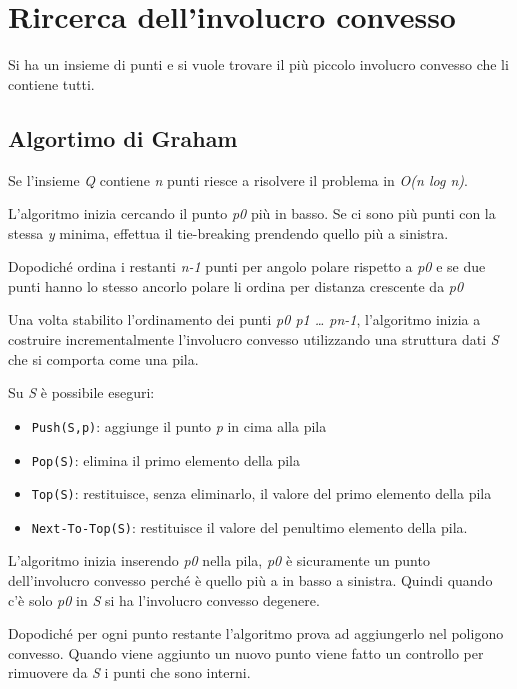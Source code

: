 \section{Rircerca dell'involucro
convesso}\label{rircerca-dellinvolucro-convesso}

Si ha un insieme di punti e si vuole trovare il più piccolo involucro
convesso che li contiene tutti.

\subsection{Algortimo di Graham}\label{algortimo-di-graham}

Se l'insieme \emph{Q} contiene \emph{n} punti riesce a risolvere il
problema in \emph{O(n log n)}.

L'algoritmo inizia cercando il punto \emph{p0} più in basso. Se ci sono
più punti con la stessa \emph{y} minima, effettua il tie-breaking
prendendo quello più a sinistra.

Dopodiché ordina i restanti \emph{n-1} punti per angolo polare rispetto
a \emph{p0} e se due punti hanno lo stesso ancorlo polare li ordina per
distanza crescente da \emph{p0}

Una volta stabilito l'ordinamento dei punti \emph{p0 p1 \ldots{} pn-1},
l'algoritmo inizia a costruire incrementalmente l'involucro convesso
utilizzando una struttura dati \emph{S} che si comporta come una pila.

Su \emph{S} è possibile eseguri:

\begin{itemize}
\tightlist
\item
  \texttt{Push(S,p)}: aggiunge il punto \emph{p} in cima alla pila
\item
  \texttt{Pop(S)}: elimina il primo elemento della pila
\item
  \texttt{Top(S)}: restituisce, senza eliminarlo, il valore del primo
  elemento della pila
\item
  \texttt{Next-To-Top(S)}: restituisce il valore del penultimo elemento
  della pila.
\end{itemize}

L'algoritmo inizia inserendo \emph{p0} nella pila, \emph{p0} è
sicuramente un punto dell'involucro convesso perché è quello più a in
basso a sinistra. Quindi quando c'è solo \emph{p0} in \emph{S} si ha
l'involucro convesso degenere.

Dopodiché per ogni punto restante l'algoritmo prova ad aggiungerlo nel
poligono convesso. Quando viene aggiunto un nuovo punto viene fatto un
controllo per rimuovere da \emph{S} i punti che sono interni.

